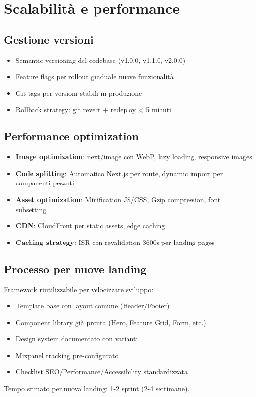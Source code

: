 \section{Scalabilità e performance}
\subsection{Gestione versioni}
\begin{itemize}
  \item Semantic versioning del codebase (v1.0.0, v1.1.0, v2.0.0)
  \item Feature flags per rollout graduale nuove funzionalità
  \item Git tags per versioni stabili in produzione
  \item Rollback strategy: git revert + redeploy < 5 minuti
\end{itemize}

\subsection{Performance optimization}
\begin{itemize}
  \item \textbf{Image optimization}: next/image con WebP, lazy loading, 
        responsive images
  \item \textbf{Code splitting}: Automatico Next.js per route, 
        dynamic import per componenti pesanti
  \item \textbf{Asset optimization}: Minification JS/CSS, Gzip 
        compression, font subsetting
  \item \textbf{CDN}: CloudFront per static assets, edge caching
  \item \textbf{Caching strategy}: ISR con revalidation 3600s per 
        landing pages
\end{itemize}

\subsection{Processo per nuove landing}
Framework riutilizzabile per velocizzare sviluppo:
\begin{itemize}
  \item Template base con layout comune (Header/Footer)
  \item Component library già pronta (Hero, Feature Grid, Form, etc.)
  \item Design system documentato con varianti
  \item Mixpanel tracking pre-configurato
  \item Checklist SEO/Performance/Accessibility standardizzata
\end{itemize}

Tempo stimato per nuova landing: 1-2 sprint (2-4 settimane).